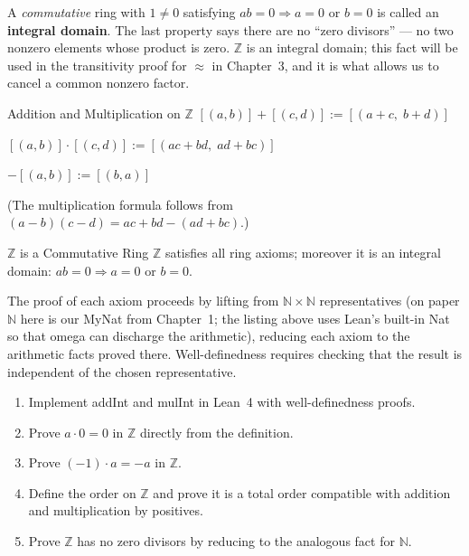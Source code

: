 \documentclass[12pt, openany]{book}
\theoremstyle{plain}
\theoremstyle{definition}
\theoremstyle{remark}
\newcommand{\N}{\mathbb{N}}
\newcommand{\Z}{\mathbb{Z}}
\newcommand{\li}[1]{{\ttfamily\small\color{tealaccent}#1}}
\begin{document}
A \emph{commutative} ring with $1 \neq 0$ satisfying $ab = 0 \Rightarrow a = 0$ or $b = 0$ is called an \textbf{integral domain}.  The last property says there are no ``zero divisors'' --- no two nonzero elements whose product is zero.  $\Z$ is an integral domain; this fact will be used in the transitivity proof for $\approx$ in Chapter~3, and it is what allows us to cancel a common nonzero factor.

\begin{defbox}{Addition and Multiplication on $\Z$}
$[(a,b)] + [(c,d)] := [(a+c,\; b+d)]$

$[(a,b)] \cdot [(c,d)] := [(ac+bd,\; ad+bc)]$

$-[(a,b)] := [(b,a)]$

(The multiplication formula follows from $(a-b)(c-d) = ac+bd - (ad+bc)$.)
\end{defbox}
\color{black}

\begin{thmbox}{$\Z$ is a Commutative Ring}
$\Z$ satisfies all ring axioms; moreover it is an integral domain: $ab = 0 \Rightarrow a = 0$ or $b = 0$.
\end{thmbox}
\color{black}

The proof of each axiom proceeds by lifting from $\N \times \N$ representatives (on paper $\N$ here is our \li{MyNat} from Chapter~1; the listing above uses Lean's built-in \li{Nat} so that \li{omega} can discharge the arithmetic), reducing each axiom to the arithmetic facts proved there. Well-definedness requires checking that the result is independent of the chosen representative.

\begin{exbox}
\begin{enumerate}
  \item Implement \li{addInt} and \li{mulInt} in Lean~4 with well-definedness proofs.
  \item Prove $a \cdot 0 = 0$ in $\Z$ directly from the definition.
  \item Prove $(-1) \cdot a = -a$ in $\Z$.
  \item Define the order on $\Z$ and prove it is a total order compatible with addition and multiplication by positives.
  \item Prove $\Z$ has no zero divisors by reducing to the analogous fact for $\N$.
\end{enumerate}
\end{exbox}
\color{black}

\end{document}
